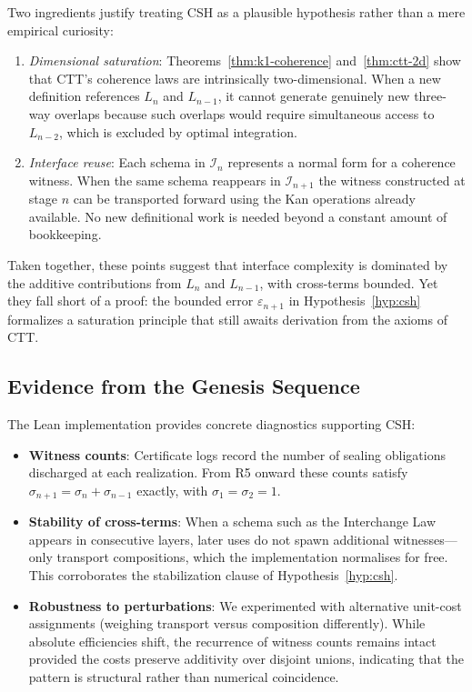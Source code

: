 \documentclass[11pt]{article}
\theoremstyle{definition}
\theoremstyle{plain}
\theoremstyle{remark}
\begin{document}
Two ingredients justify treating CSH as a plausible hypothesis rather than a mere empirical curiosity:
\begin{enumerate}
\item \emph{Dimensional saturation}: Theorems~\ref{thm:k1-coherence} and~\ref{thm:ctt-2d} show that CTT's coherence laws are intrinsically two-dimensional. When a new definition references $L_n$ and $L_{n-1}$, it cannot generate genuinely new three-way overlaps because such overlaps would require simultaneous access to $L_{n-2}$, which is excluded by optimal integration.
\item \emph{Interface reuse}: Each schema in $\mathcal{I}_n$ represents a normal form for a coherence witness. When the same schema reappears in $\mathcal{I}_{n+1}$ the witness constructed at stage $n$ can be transported forward using the Kan operations already available. No new definitional work is needed beyond a constant amount of bookkeeping.
\end{enumerate}

Taken together, these points suggest that interface complexity is dominated by the additive contributions from $L_n$ and $L_{n-1}$, with cross-terms bounded. Yet they fall short of a proof: the bounded error $\varepsilon_{n+1}$ in Hypothesis~\ref{hyp:csh} formalizes a saturation principle that still awaits derivation from the axioms of CTT.

\subsection{Evidence from the Genesis Sequence}

The Lean implementation provides concrete diagnostics supporting CSH:
\begin{itemize}
\item \textbf{Witness counts}: Certificate logs record the number of sealing obligations discharged at each realization. From R5 onward these counts satisfy $\sigma_{n+1} = \sigma_n + \sigma_{n-1}$ exactly, with $\sigma_1 = \sigma_2 = 1$.
\item \textbf{Stability of cross-terms}: When a schema such as the Interchange Law appears in consecutive layers, later uses do not spawn additional witnesses—only transport compositions, which the implementation normalises for free. This corroborates the stabilization clause of Hypothesis~\ref{hyp:csh}.
\item \textbf{Robustness to perturbations}: We experimented with alternative unit-cost assignments (weighing transport versus composition differently). While absolute efficiencies shift, the recurrence of witness counts remains intact provided the costs preserve additivity over disjoint unions, indicating that the pattern is structural rather than numerical coincidence.
\end{itemize}
\end{document}
